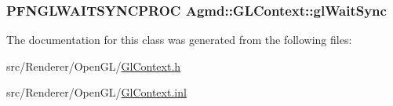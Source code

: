 \hypertarget{class_agmd_1_1_g_l_context_a02f15f63c70d68b8c2e997ee2901e513}{
\subsubsection[{gl\+Wait\+Sync}]{\setlength{\rightskip}{0pt plus 5cm}P\+F\+N\+G\+L\+W\+A\+I\+T\+S\+Y\+N\+C\+P\+R\+O\+C Agmd\+::\+G\+L\+Context\+::gl\+Wait\+Sync}}\label{class_agmd_1_1_g_l_context_a02f15f63c70d68b8c2e997ee2901e513}


The documentation for this class was generated from the following files\+:\begin{DoxyCompactItemize}
\item 
src/\+Renderer/\+Open\+G\+L/\hyperlink{_gl_context_8h}{Gl\+Context.\+h}\item 
src/\+Renderer/\+Open\+G\+L/\hyperlink{_gl_context_8inl}{Gl\+Context.\+inl}\end{DoxyCompactItemize}

